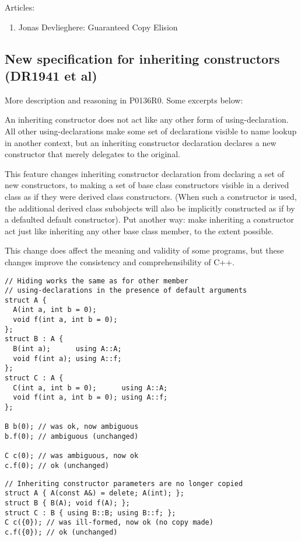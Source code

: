 Articles:
\begin{enumerate}
\item Jonas Devlieghere: Guaranteed Copy Elision
\end{enumerate}

\subsection{New specification for inheriting constructors (DR1941 et al)}

More description and reasoning in P0136R0. Some excerpts below:

An inheriting constructor does not act like any other form of using-declaration. All other using-declarations make some set of declarations visible to name lookup in another context, but an inheriting constructor declaration declares a new constructor that merely delegates to the original.

This feature changes inheriting constructor declaration from declaring a set of new constructors, to making a set of base class constructors visible in a derived class as if they were derived class constructors. (When such a constructor is used, the additional derived class subobjects will also be implicitly constructed as if by a defaulted default constructor). Put another way: make inheriting a constructor act just like inheriting any other base class member, to the extent possible.

This change does affect the meaning and validity of some programs, but these changes improve the consistency and comprehensibility of C++.

\begin{verbatim}
// Hiding works the same as for other member 
// using-declarations in the presence of default arguments 
struct A {
  A(int a, int b = 0);
  void f(int a, int b = 0);
};
struct B : A {
  B(int a);      using A::A;
  void f(int a); using A::f;
};
struct C : A {
  C(int a, int b = 0);      using A::A;
  void f(int a, int b = 0); using A::f;
};

B b(0); // was ok, now ambiguous
b.f(0); // ambiguous (unchanged)

C c(0); // was ambiguous, now ok
c.f(0); // ok (unchanged)
\end{verbatim}

\begin{verbatim}
// Inheriting constructor parameters are no longer copied
struct A { A(const A&) = delete; A(int); };
struct B { B(A); void f(A); };
struct C : B { using B::B; using B::f; };
C c({0}); // was ill-formed, now ok (no copy made)
c.f({0}); // ok (unchanged)
\end{verbatim}

